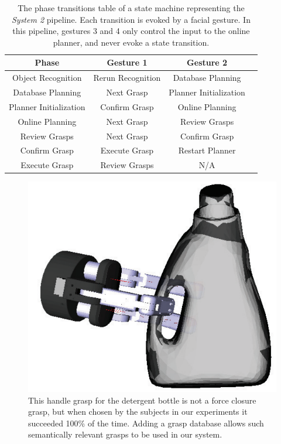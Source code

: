 \begin{table}
\centering
\begin{tabular}{ | c | c | c | c | }
\hline
Phase & Gesture 1 & Gesture 2 \\ \hline \hline
Object Recognition & Rerun Recognition & Database Planning \\ \hline
Database Planning & Next Grasp & Planner Initialization \\ \hline
Planner Initialization & Confirm Grasp & Online Planning \\ \hline
Online Planning & Next Grasp &  Review Grasps \\ \hline
Review Grasps & Next Grasp & Confirm Grasp \\ \hline
Confirm Grasp & Execute Grasp & Restart Planner \\ \hline
Execute Grasp & Review Grasps & N/A \\ \hline
\end{tabular}
\caption{The phase transitions table of a state machine representing the \emph{System 2} pipeline. Each transition is evoked by a facial gesture. In this pipeline, gestures 3 and 4 only control the input to the online planner, and never evoke a state transition.}
\label{tab:gestures_2}
\end{table}



\begin{figure}
\centering
\includegraphics[height=.2\textheight]{manual_grasp_1.png}
\caption{This handle grasp for the detergent bottle is not a force closure grasp, but when chosen by the subjects in our experiments it succeeded 100\% of the time. Adding a grasp database allows such semantically relevant grasps to be used in our system.}
\label{fig:manual_grasp_1}
\end{figure}


